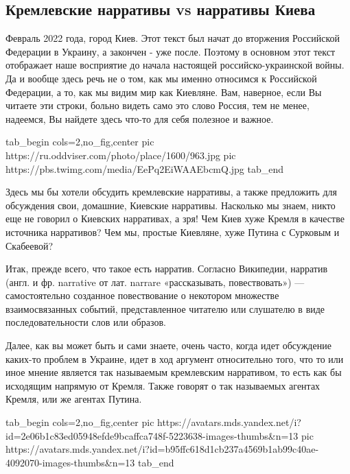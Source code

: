  
 
 
 
 

\subsection{Кремлевские нарративы vs нарративы Киева}

Февраль 2022 года, город Киев. Этот текст был начат до вторжения Российской
Федерации в Украину, а закончен - уже после. Поэтому в основном этот текст
отображает наше восприятие до начала настоящей российско-украинской войны.  Да
и вообще здесь речь не о том, как мы именно относимся к Российской Федерации, а
то, как мы видим мир как Киевляне. Вам, наверное, если Вы читаете эти строки,
больно видеть само это слово Россия, тем не менее, надеемся, Вы найдете здесь
что-то для себя полезное и важное.

\ifcmt
  tab_begin cols=2,no_fig,center
     pic https://ru.oddviser.com/photo/place/1600/963.jpg
		 pic https://pbs.twimg.com/media/EePq2EiWAAEbcmQ.jpg
  tab_end
\fi

Здесь мы бы хотели обсудить кремлевские нарративы, а также предложить для
обсуждения свои, домашние, Киевские нарративы. Насколько мы знаем, никто еще не
говорил о Киевских нарративах, а зря! Чем Киев хуже Кремля в качестве источника
нарративов? Чем мы, простые Киевляне, хуже Путина с Сурковым и Скабеевой?

Итак, прежде всего, что такое есть нарратив. Согласно Википедии, нарратив
(англ. и фр. narrative от лат. narrare «рассказывать, повествовать») —
самостоятельно созданное повествование о некотором множестве взаимосвязанных
событий, представленное читателю или слушателю в виде последовательности слов
или образов.

Далее, как вы может быть и сами знаете, очень часто, когда идет обсуждение
каких-то проблем в Украине, идет в ход аргумент относительно того, что то или
иное мнение является так называемым кремлевским нарративом, то есть как бы
исходящим напрямую от Кремля. Также говорят о так называемых агентах Кремля,
или же агентах Путина.

\ifcmt
  tab_begin cols=2,no_fig,center
     pic https://avatars.mds.yandex.net/i?id=2e06b1c83ed05948efde9bcaffca748f-5223638-images-thumbs&n=13
		 pic https://avatars.mds.yandex.net/i?id=b95ffc618d1cb237a4569b1ab99c40ae-4092070-images-thumbs&n=13
  tab_end
\fi

